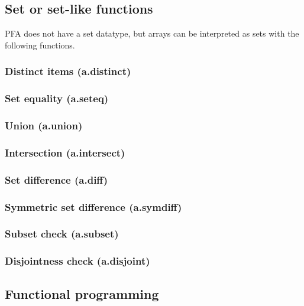 \documentclass{article}
\theoremstyle{definition}
\begin{document}
\hypertarget{hsec:set-like}{}
\subsection{Set or set-like functions}
\label{sec:set-like}

PFA does not have a set datatype, but arrays can be interpreted as sets with the following functions.

\subsubsection{Distinct items (a.distinct)}

\subsubsection{Set equality (a.seteq)}

\subsubsection{Union (a.union)}

\subsubsection{Intersection (a.intersect)}

\subsubsection{Set difference (a.diff)}

\subsubsection{Symmetric set difference (a.symdiff)}

\subsubsection{Subset check (a.subset)}

\subsubsection{Disjointness check (a.disjoint)}

\subsection{Functional programming}
\end{document}
